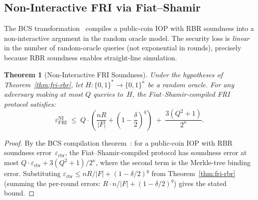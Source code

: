 \documentclass[11pt]{article}
\newtheorem{theorem}{Theorem}
\begin{document}
\subsection{Non-Interactive FRI via Fiat--Shamir}

The BCS transformation~\cite{BCS16} compiles a public-coin IOP with RBR soundness into a non-interactive argument in the random oracle model.  The security loss is \emph{linear} in the number of random-oracle queries (not exponential in rounds), precisely because RBR soundness enables straight-line simulation.

\begin{theorem}[Non-Interactive FRI Soundness]
\label{thm:fri-ni}
Under the hypotheses of Theorem~\ref{thm:fri-rbr}, let $H: \{0,1\}^* \to \{0,1\}^\kappa$ be a random oracle.  For any adversary making at most $Q$ queries to~$H$, the Fiat--Shamir-compiled FRI protocol satisfies:
$$\varepsilon_{\mathrm{FRI}}^{\mathrm{NI}} \;\leq\; Q \cdot \left(\frac{nR}{|F|} + \left(1 - \frac{\delta}{2}\right)^q\right) \;+\; \frac{3(Q^2 + 1)}{2^\kappa}.$$
\end{theorem}

\begin{proof}
By the BCS compilation theorem~\cite{BCS16,BGKTTW}: for a public-coin IOP with RBR soundness error~$\varepsilon_{\mathrm{rbr}}$, the Fiat--Shamir-compiled protocol has soundness error at most $Q \cdot \varepsilon_{\mathrm{rbr}} + 3(Q^2{+}1)/2^\kappa$, where the second term is the Merkle-tree binding error. Substituting $\varepsilon_{\mathrm{rbr}} \leq nR/|F| + (1{-}\delta/2)^q$ from Theorem~\ref{thm:fri-rbr} (summing the per-round errors: $R \cdot n/|F| + (1{-}\delta/2)^q$) gives the stated bound.
\end{proof}
\end{document}
